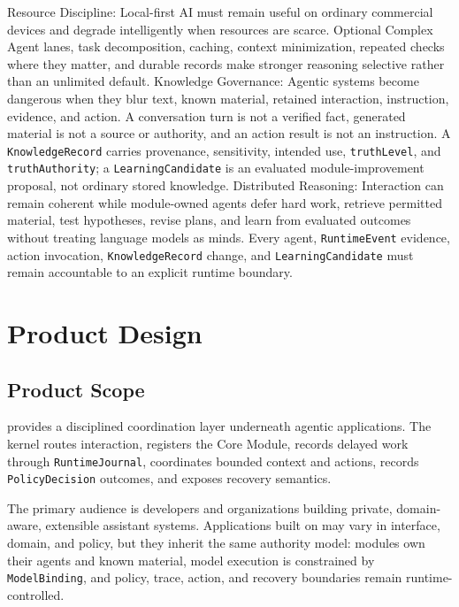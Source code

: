 \documentclass[11pt]{report}
\begin{document}
\begin{itemize}
	\itembf Resource Discipline:
	\subitem Local-first AI must remain useful on ordinary commercial devices and degrade intelligently when resources are scarce.
	\subitem Optional Complex Agent lanes, task decomposition, caching, context minimization, repeated checks where they matter, and durable records make stronger reasoning selective rather than an unlimited default.
	\itembf Knowledge Governance:
	\subitem Agentic systems become dangerous when they blur text, known material, retained interaction, instruction, evidence, and action. A conversation turn is not a verified fact, generated material is not a source or authority, and an action result is not an instruction.
	\subitem A \texttt{KnowledgeRecord} carries provenance, sensitivity, intended use, \texttt{truthLevel}, and \texttt{truthAuthority}; a \texttt{LearningCandidate} is an evaluated module-improvement proposal, not ordinary stored knowledge.
	\itembf Distributed Reasoning:
	\subitem Interaction can remain coherent while module-owned agents defer hard work, retrieve permitted material, test hypotheses, revise plans, and learn from evaluated outcomes without treating language models as minds.
	\subitem Every agent, \texttt{RuntimeEvent} evidence, action invocation, \texttt{KnowledgeRecord} change, and \texttt{LearningCandidate} must remain accountable to an explicit runtime boundary.
\end{itemize}

\section{Product Design}

\subsection{Product Scope}

\Madre provides a disciplined coordination layer underneath agentic applications. The kernel routes interaction, registers the Core Module, records delayed work through \texttt{RuntimeJournal}, coordinates bounded context and actions, records \texttt{PolicyDecision} outcomes, and exposes recovery semantics.

The primary audience is developers and organizations building private, domain-aware, extensible assistant systems. Applications built on \Madre may vary in interface, domain, and policy, but they inherit the same authority model: modules own their agents and known material, model execution is constrained by \texttt{ModelBinding}, and policy, trace, action, and recovery boundaries remain runtime-controlled.
\end{document}
